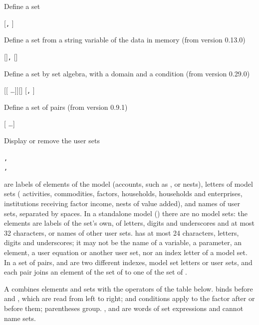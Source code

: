 Define a set
\begin{stsyntax}
  \cmd{=}  [\texttt{,} ]
\end{stsyntax}
Define a set from a string variable of the data in memory (from version 0.13.0)
\begin{stsyntax}
 [\cmd{(}\cmd{)}]\texttt{,}  []
\end{stsyntax}
Define a set by set algebra, with a domain and a condition (from version 0.29.0)
\begin{stsyntax}
 [\cmd{(}[\cmd{,} \dots]\cmd{)}][\cmd{$(}\cmd{)}] \cmd{=}  [\texttt{,} ]
\end{stsyntax}
Define a set of pairs (from version 0.9.1)
\begin{stsyntax}
 \cmd{(}\cmd{,}\cmd{)} \cmd{=}  [ \dots]
\end{stsyntax}
Display or remove the user sets
\begin{stsyntax}
 \texttt{,} \\
 \texttt{,} 
\end{stsyntax}
 are labels of elements of the model (accounts, such as
, or nests), letters of model sets ( activities, 
commodities,  factors,  households,  households and
enterprises,  institutions receiving factor income,  nests of
value added), and names of user sets, separated by spaces. In a standalone
model () there are no model sets: the elements are labels
of the set's own, of letters, digits and underscores and at most 32
characters, or names of other user sets.  has at
most 24 characters, letters, digits and underscores; it may not be the name
of a variable, a parameter, an element, a user equation or another user set,
nor an index letter of a model set. In a set of pairs,  and
 are two different indexes, model set letters or user sets, and each
pair  joins an element of the set of  to one of
the set of .

A  combines elements and sets with the operators of
the table below. \cmd{*} binds before \cmd{+} and \cmd{-}, which are
read from left to right;  and conditions apply to the factor after
or before them; parentheses group. ,  and  are
words of set expressions and cannot name sets.

